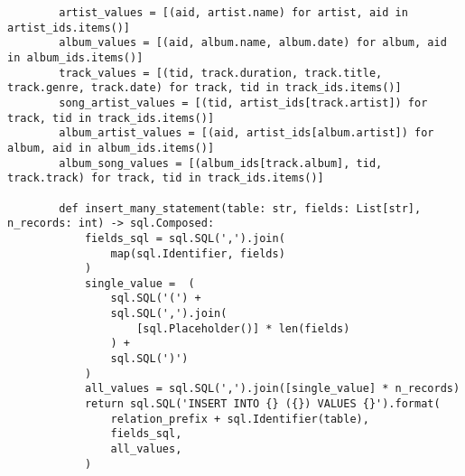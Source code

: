 \documentclass[12pt]{article}
\begin{document}
    \begin{lstlisting}
        artist_values = [(aid, artist.name) for artist, aid in artist_ids.items()]
        album_values = [(aid, album.name, album.date) for album, aid in album_ids.items()]
        track_values = [(tid, track.duration, track.title, track.genre, track.date) for track, tid in track_ids.items()]
        song_artist_values = [(tid, artist_ids[track.artist]) for track, tid in track_ids.items()]
        album_artist_values = [(aid, artist_ids[album.artist]) for album, aid in album_ids.items()]
        album_song_values = [(album_ids[track.album], tid, track.track) for track, tid in track_ids.items()]

        def insert_many_statement(table: str, fields: List[str], n_records: int) -> sql.Composed:
            fields_sql = sql.SQL(',').join(
                map(sql.Identifier, fields)
            )
            single_value =  (
                sql.SQL('(') +
                sql.SQL(',').join(
                    [sql.Placeholder()] * len(fields)
                ) +
                sql.SQL(')')
            )
            all_values = sql.SQL(',').join([single_value] * n_records)
            return sql.SQL('INSERT INTO {} ({}) VALUES {}').format(
                relation_prefix + sql.Identifier(table),
                fields_sql,
                all_values,
            )
    \end{lstlisting}

    
\end{document}
